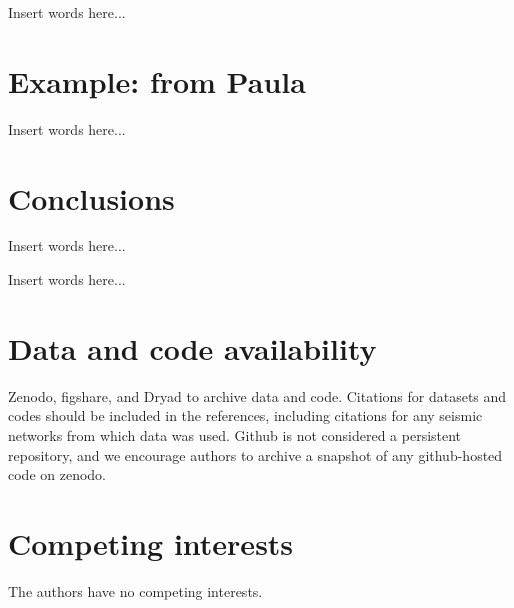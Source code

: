 \documentclass[preprint]{seismica}
\begin{document}
    Insert words here...

\section{Example: from Paula} \label{sec:example}

    Insert words here...

\section{Conclusions} \label{sec:conclusion}

    Insert words here...

\begin{acknowledgements}
    [Suzan] Insert words here...
\end{acknowledgements}

\section*{Data and code availability}
Zenodo, figshare, and Dryad to archive data and code. Citations for datasets and codes should be
included in the references, including citations for any seismic networks from which data was used.
Github is not considered a persistent repository, and we encourage authors to archive a snapshot of
any github-hosted code on zenodo.

\section*{Competing interests}
    The authors have no competing interests.


   
\end{document}
